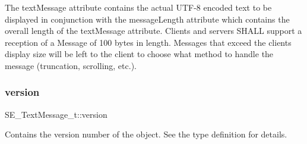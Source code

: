 The text\+Message attribute contains the actual U\+T\+F-\/8 encoded text to be displayed in conjunction with the message\+Length attribute which contains the overall length of the text\+Message attribute. Clients and servers S\+H\+A\+LL support a reception of a Message of 100 bytes in length. Messages that exceed the clients display size will be left to the client to choose what method to handle the message (truncation, scrolling, etc.). \mbox{\label{group__TextMessage_ga9101eb2e0eeca3eac5a47da06fb26423}} 
\subsubsection{\texorpdfstring{version}{version}}
{\footnotesize\ttfamily S\+E\+\_\+\+Text\+Message\+\_\+t\+::version}

Contains the version number of the object. See the type definition for details. 